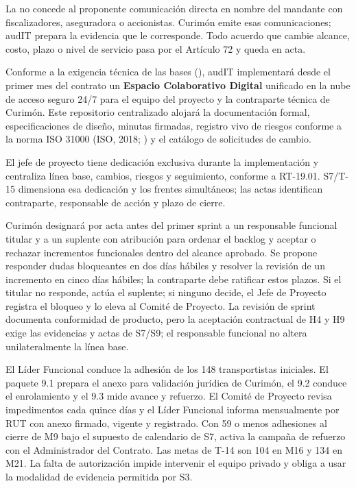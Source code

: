 La  no concede al proponente comunicación directa en nombre del mandante con fiscalizadores, aseguradora o accionistas. Curimón emite esas comunicaciones; audIT prepara la evidencia que le corresponde. Todo acuerdo que cambie alcance, costo, plazo o nivel de servicio pasa por el Artículo 72 y queda en acta.

Conforme a la exigencia técnica de las bases (), audIT implementará desde el primer mes del contrato un \textbf{Espacio Colaborativo Digital} unificado en la nube de acceso seguro 24/7 para el equipo del proyecto y la contraparte técnica de Curimón. Este repositorio centralizado alojará la documentación formal, especificaciones de diseño, minutas firmadas, registro vivo de riesgos conforme a la norma ISO 31000 (ISO, 2018; ) y el catálogo de solicitudes de cambio.

El jefe de proyecto tiene dedicación exclusiva durante la implementación y centraliza línea base, cambios, riesgos y seguimiento, conforme a RT-19.01. S7/T-15 dimensiona esa dedicación y los frentes simultáneos; las actas identifican contraparte, responsable de acción y plazo de cierre.

Curimón designará por acta antes del primer sprint a un responsable funcional titular y a un suplente con atribución para ordenar el backlog y aceptar o rechazar incrementos funcionales dentro del alcance aprobado. Se propone responder dudas bloqueantes en dos días hábiles y resolver la revisión de un incremento en cinco días hábiles; la contraparte debe ratificar estos plazos. Si el titular no responde, actúa el suplente; si ninguno decide, el Jefe de Proyecto registra el bloqueo y lo eleva al Comité de Proyecto. La revisión de sprint documenta conformidad de producto, pero la aceptación contractual de H4 y H9 exige las evidencias y actas de S7/S9; el responsable funcional no altera unilateralmente la línea base.

El Líder Funcional conduce la adhesión de los 148 transportistas iniciales. El paquete 9.1 prepara el anexo para validación jurídica de Curimón, el 9.2 conduce el enrolamiento y el 9.3 mide avance y refuerzo. El Comité de Proyecto revisa impedimentos cada quince días y el Líder Funcional informa mensualmente por RUT con anexo firmado, vigente y registrado. Con 59 o menos adhesiones al cierre de M9 bajo el supuesto de calendario de S7, activa la campaña de refuerzo con el Administrador del Contrato. Las metas de T-14 son 104 en M16 y 134 en M21. La falta de autorización impide intervenir el equipo privado y obliga a usar la modalidad de evidencia permitida por S3.

